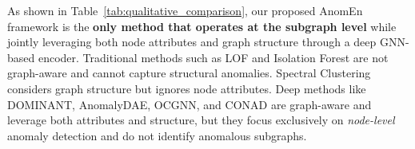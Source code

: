 \documentclass[10pt,twocolumn,a4paper]{article}
\begin{document}
\begin{table}[ht]
\centering
\caption{Qualitative Comparison of AnomEn with Existing Graph Anomaly Detection Methods}
\label{tab:qualitative_comparison}
\end{table}

As shown in Table~\ref{tab:qualitative_comparison}, our proposed AnomEn framework is the \textbf{only method that operates at the subgraph level} while jointly leveraging both node attributes and graph structure through a deep GNN-based encoder. Traditional methods such as LOF and Isolation Forest are not graph-aware and cannot capture structural anomalies. Spectral Clustering considers graph structure but ignores node attributes. Deep methods like DOMINANT, AnomalyDAE, OCGNN, and CONAD are graph-aware and leverage both attributes and structure, but they focus exclusively on \textit{node-level} anomaly detection and do not identify anomalous subgraphs.
\end{document}
